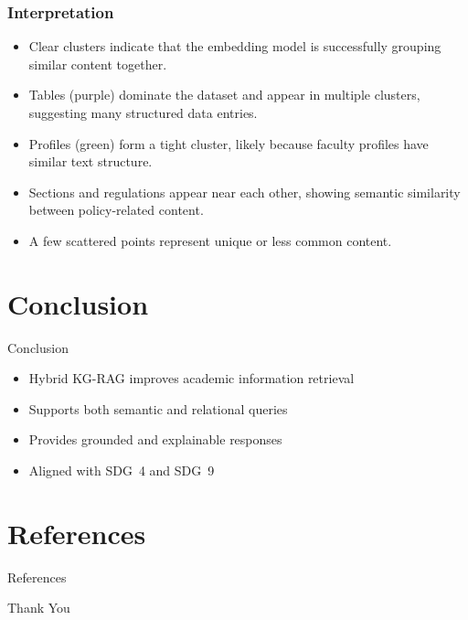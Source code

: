 \documentclass[10pt,aspectratio=1610]{beamer}
\begin{document}
\begin{frame}
\frametitle{Interpretation }

\begin{itemize}
    \item Clear clusters indicate that the embedding model is successfully grouping similar content together.
    \item Tables (purple) dominate the dataset and appear in multiple clusters, suggesting many structured data entries.
    \item Profiles (green) form a tight cluster, likely because faculty profiles have similar text structure.
    \item Sections and regulations appear near each other, showing semantic similarity between policy-related content.
    \item A few scattered points represent unique or less common content.
\end{itemize}

\end{frame}



\section{Conclusion}
\begin{frame}{Conclusion}
\begin{itemize}
\item Hybrid KG-RAG improves academic information retrieval
\item Supports both semantic and relational queries
\item Provides grounded and explainable responses
\item Aligned with SDG~4 and SDG~9
\end{itemize}
\end{frame}

\section{References}
\begin{frame}{References}
\scriptsize


\end{frame}

\begin{frame}
\centering
\Huge \textcolor{myNewColorA}{Thank You}
\end{frame}
\end{document}
